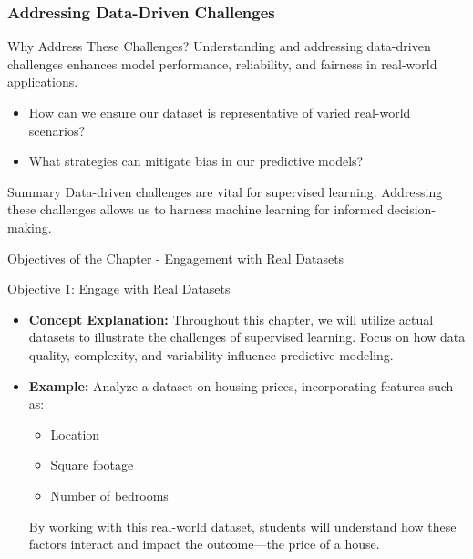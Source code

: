 \documentclass[aspectratio=169]{beamer}
\begin{document}
\begin{frame}[fragile]
    \frametitle{Addressing Data-Driven Challenges}
    
    \begin{block}{Why Address These Challenges?}
        Understanding and addressing data-driven challenges enhances model performance, reliability, and fairness in real-world applications.
    \end{block}
    
    \begin{itemize}
        \item How can we ensure our dataset is representative of varied real-world scenarios?
        \item What strategies can mitigate bias in our predictive models?
    \end{itemize}
    
    \begin{block}{Summary}
        Data-driven challenges are vital for supervised learning. Addressing these challenges allows us to harness machine learning for informed decision-making.
    \end{block}
\end{frame}

\begin{frame}[fragile]{Objectives of the Chapter - Engagement with Real Datasets}
    \begin{block}{Objective 1: Engage with Real Datasets}
        \begin{itemize}
            \item \textbf{Concept Explanation:} Throughout this chapter, we will utilize actual datasets to illustrate the challenges of supervised learning. Focus on how data quality, complexity, and variability influence predictive modeling.
            \item \textbf{Example:} Analyze a dataset on housing prices, incorporating features such as:
            \begin{itemize}
                \item Location 
                \item Square footage 
                \item Number of bedrooms
            \end{itemize}
            By working with this real-world dataset, students will understand how these factors interact and impact the outcome—the price of a house.
        \end{itemize}
    \end{block}
\end{frame}
\end{document}
